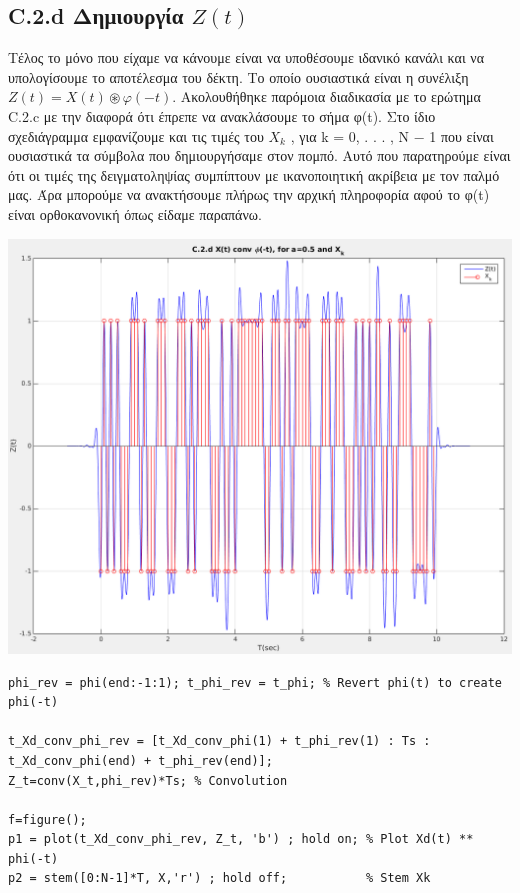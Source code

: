 \documentclass[11pt]{article}
\begin{document}
    \subsection*{C.2.d Δημιουργία $Z(t)$}
    Τέλος το μόνο που είχαμε να κάνουμε είναι να υποθέσουμε ιδανικό κανάλι και να υπολογίσουμε το αποτέλεσμα του δέκτη. Το οποίο ουσιαστικά είναι η συνέλιξη $Z(t) = X(t) \circledast φ(−t)$. Ακολουθήθηκε παρόμοια διαδικασία με το ερώτημα C.2.c με την διαφορά ότι έπρεπε να ανακλάσουμε το σήμα φ(t). Στο ίδιο σχεδιάγραμμα εμφανίζουμε και τις τιμές του $X_k$ , για k = 0, . . . , N − 1 που είναι ουσιαστικά τα σύμβολα που δημιουργήσαμε στον πομπό. Αυτό που παρατηρούμε είναι ότι οι τιμές της δειγματοληψίας συμπίπτουν με ικανοποιητική ακρίβεια με τον παλμό μας. Άρα μπορούμε να ανακτήσουμε πλήρως την αρχική πληροφορία αφού το φ(t) είναι ορθοκανονική όπως είδαμε παραπάνω.
    
    \begin{center}
        \includegraphics[scale=0.4]{photos/C.2.d Z(t) and Xk_screenshot.png}
    \end{center} 

\begin{lstlisting}[caption = {C.2.d}]
phi_rev = phi(end:-1:1); t_phi_rev = t_phi; % Revert phi(t) to create phi(-t)

t_Xd_conv_phi_rev = [t_Xd_conv_phi(1) + t_phi_rev(1) : Ts : t_Xd_conv_phi(end) + t_phi_rev(end)];
Z_t=conv(X_t,phi_rev)*Ts; % Convolution

f=figure();
p1 = plot(t_Xd_conv_phi_rev, Z_t, 'b') ; hold on; % Plot Xd(t) ** phi(-t)
p2 = stem([0:N-1]*T, X,'r') ; hold off;           % Stem Xk 
\end{lstlisting}
\end{document}

